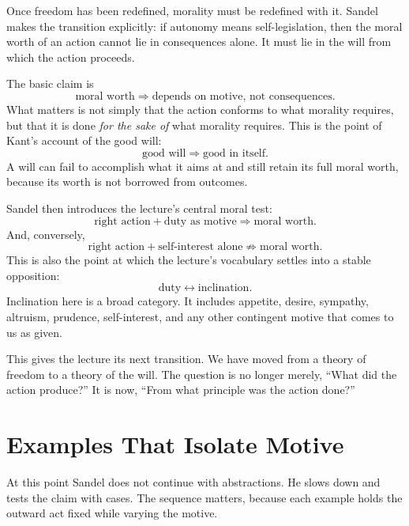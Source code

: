 Once freedom has been redefined, morality must be redefined with it. Sandel makes the transition explicitly: if autonomy means self-legislation, then the moral worth of an action cannot lie in consequences alone. It must lie in the will from which the action proceeds.

The basic claim is
\begin{equation}
\text{moral worth} \Longrightarrow \text{depends on motive, not consequences}.
\end{equation}
What matters is not simply that the action conforms to what morality requires, but that it is done \emph{for the sake of} what morality requires. This is the point of Kant's account of the good will:
\begin{equation}
\text{good will} \Longrightarrow \text{good in itself}.
\end{equation}
A will can fail to accomplish what it aims at and still retain its full moral worth, because its worth is not borrowed from outcomes.

Sandel then introduces the lecture's central moral test:
\begin{equation}
\text{right action} + \text{duty as motive} \Longrightarrow \text{moral worth}.
\end{equation}
And, conversely,
\begin{equation}
\text{right action} + \text{self-interest alone} \not\Longrightarrow \text{moral worth}.
\end{equation}
This is also the point at which the lecture's vocabulary settles into a stable opposition:
\begin{equation}
\text{duty} \leftrightarrow \text{inclination}.
\end{equation}
Inclination here is a broad category. It includes appetite, desire, sympathy, altruism, prudence, self-interest, and any other contingent motive that comes to us as given.

This gives the lecture its next transition. We have moved from a theory of freedom to a theory of the will. The question is no longer merely, ``What did the action produce?'' It is now, ``From what principle was the action done?''

\section{Examples That Isolate Motive}

At this point Sandel does not continue with abstractions. He slows down and tests the claim with cases. The sequence matters, because each example holds the outward act fixed while varying the motive.

